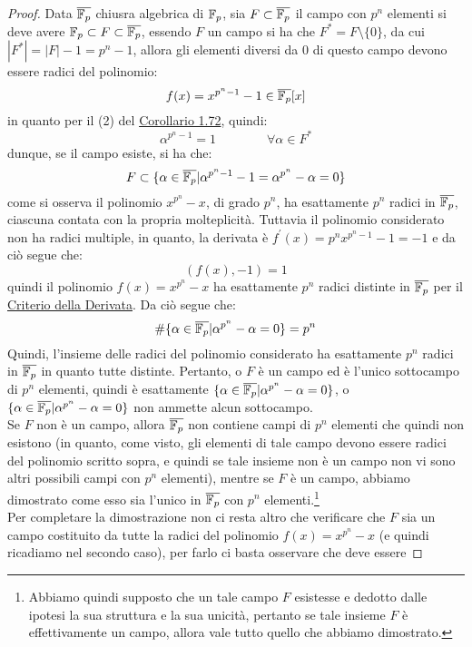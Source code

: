 \documentclass[11pt]{scrartcl}
\begin{document}
\begin{proof}
	Data $\overline {{\mathbb F}_p}$ chiusra algebrica di ${\mathbb F}_p$, sia $F \subset \overline{{\mathbb F}_p}$ il campo con $p^n$ elementi
	si deve avere ${\mathbb F}_p \subset F \subset \overline{{\mathbb F}_p}$, essendo $F$ un campo si ha che $F^* = F \setminus \{0\}$,
	da cui $|F^*| = |F| - 1 = p^n - 1$, allora gli elementi diversi da $0$ di questo campo devono essere
	radici del polinomio:
		\[ f(x) = x^{p^{n}-1}-1 \in \overline{{\mathbb F}_p}[x]
			\]
	in quanto per il (2) del \hyperref[g:OrdLagrange]{Corollario 1.72}, quindi:
		\[ \alpha^{p^n-1} = 1
		\qquad\qquad \forall \alpha \in F^*
			\]
	dunque, se il campo esiste, si ha che:
		\[ F \subset \{\alpha \in \overline{{\mathbb F}_p} | \alpha^{p^n-1} - 1 = \alpha^{p^n} - \alpha = 0\}
			\]
	come si osserva il polinomio $ x^{p^n}-x$, di grado $p^n$, ha esattamente 
	$p^n$ radici in $\overline{{\mathbb F}_p}$, ciascuna contata con la propria molteplicità. Tuttavia il polinomio considerato non
	ha radici multiple, in quanto, la derivata è $f^{\prime}(x) = p^nx^{p^n-1} - 1 = -1$ e da ciò segue che:
		\[ (f(x), -1) = 1
			\]
	quindi il polinomio $f(x) = x^{p^n}-x$ ha esattamente $p^n$ radici distinte in $\overline{{\mathbb F}_p}$ per il \hyperref[p:der]{Criterio della Derivata}. Da ciò segue che:
		\[ \#\{\alpha \in \overline{{\mathbb F}_p} | \alpha^{p^n} - \alpha = 0\} = p^n
		\]
	Quindi, l'insieme delle radici del polinomio considerato ha esattamente $p^n$ radici in $\overline{{\mathbb F}_p}$ in quanto tutte distinte.
	Pertanto, o $F$ è un campo ed è l'unico sottocampo di $p^n$ elementi, quindi è esattamente $\{\alpha \in \overline{{\mathbb F}_p} |\alpha^{p^n} - \alpha = 0\}$, 
	o $\{\alpha \in \overline{{\mathbb F}_p} |\alpha^{p^n} - \alpha = 0\}$ non ammette alcun sottocampo.\\
	 Se $F$ non è un campo, allora $\overline{{\mathbb F}_p}$ non contiene campi di $p^n$ elementi che quindi non esistono (in quanto, come visto, gli elementi di tale campo devono essere
	 radici del polinomio scritto sopra, e quindi se tale insieme non è un campo non vi sono altri possibili campi con $p^{n}$ elementi), mentre se $F$ è un campo, abbiamo dimostrato
	come esso sia l'unico in $\overline{{\mathbb F}_p}$ con $p^n$ elementi.\footnote{Abbiamo quindi supposto che un tale campo $F$ esistesse e dedotto
	 dalle ipotesi la sua struttura e la sua unicità, pertanto se tale insieme $F$ è effettivamente un campo, allora vale tutto quello che
	 abbiamo dimostrato.}\\
	Per completare la dimostrazione non ci resta altro che verificare che $F$ sia un campo costituito da tutte la radici 
	del polinomio $f(x) = x^{p^n}-x$ (e quindi ricadiamo nel secondo caso), per farlo ci basta osservare che deve essere

\end{proof}
\end{document}
